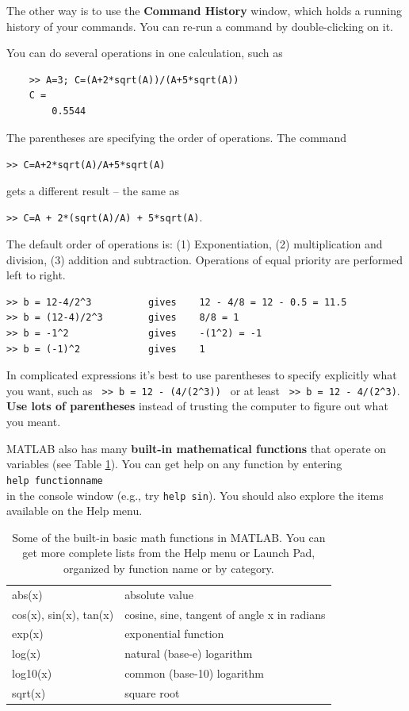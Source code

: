 \documentclass [11pt]{article}
\newcommand{\tab}{\hspace*{0.5in}}
\numberwithin{exercise}{section}
\begin{document}
The other way is to use the \textbf{Command History} 
window, which holds a running history of your commands. You can re-run a 
command by double-clicking on it. 

You can do several operations in one calculation, such as 
\begin{verbatim}
    >> A=3; C=(A+2*sqrt(A))/(A+5*sqrt(A))
    C =
        0.5544
\end{verbatim}
The parentheses are specifying the order of operations. The command 

\tab \texttt{>>  C=A+2*sqrt(A)/A+5*sqrt(A)} 

gets a different result -- the same as 

\tab \texttt{>>  C=A + 2*(sqrt(A)/A) + 5*sqrt(A)}. 

The default order of operations is: (1) Exponentiation, (2) multiplication 
and division, (3) addition and subtraction. Operations of equal priority are 
performed left to right.
\begin{verbatim}
>> b = 12-4/2^3          gives    12 - 4/8 = 12 - 0.5 = 11.5
>> b = (12-4)/2^3        gives    8/8 = 1
>> b = -1^2              gives    -(1^2) = -1
>> b = (-1)^2            gives    1 
\end{verbatim}
In complicated expressions it's best to use parentheses to specify 
explicitly what you want, such as \verb! >> b = 12 - (4/(2^3)) ! 
or at least \verb! >> b = 12 - 4/(2^3)!. \textbf{Use lots of parentheses} instead of
trusting the computer to figure out what you meant.  

MATLAB also has many \textbf{built-in mathematical functions} that operate on variables
(see Table \ref{MathFunctions}). You can get help on any function by entering \\
\hspace*{1in} \texttt{help functionname} \\
in the console window (e.g., try \texttt{help sin}). You should also explore
the items available on the Help menu. 
 
\begin{table}
\begin{tabular}{p{140pt}p{280pt}}
\hline
\hline
abs(x) & absolute value \\
cos(x), sin(x), tan(x) &  cosine, sine, tangent of angle x in radians\\
exp(x)  & exponential function  \\
log(x)  & natural (base-e) logarithm \\
log10(x) &  common (base-10) logarithm \\
sqrt(x)  &  square root \\
\hline
\hline  
\end{tabular}
\caption{Some of the built-in basic math functions in MATLAB. You can
get more complete lists from the Help menu or Launch Pad, organized by 
function name or by category.} 
\label{MathFunctions}
\end{table}
\end{document}
